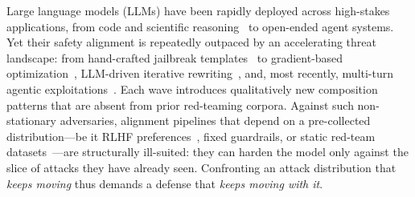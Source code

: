 Large language models (LLMs) have been rapidly deployed across high-stakes applications, from code and scientific reasoning~\citep{bai2025intern} to open-ended agent systems. Yet their safety alignment is repeatedly outpaced by an accelerating threat landscape: from hand-crafted jailbreak templates~\citep{shen2023doanythingnow} to gradient-based optimization~\citep{zou2023universal}, LLM-driven iterative rewriting~\citep{chao2023pair, mehrotra2024tap, liu2023autodan}, and, most recently, multi-turn agentic exploitations~\citep{rahman2025xteaming, qi2025majic, samvelyan2024rainbow}. Each wave introduces qualitatively new composition patterns that are absent from prior red-teaming corpora. Against such non-stationary adversaries, alignment pipelines that depend on a pre-collected distribution---be it RLHF preferences~\citep{ouyang2022training, bai2022constitutional, dai2023safe}, fixed guardrails, or static red-team datasets~\citep{jiang2024wildteaming, xie2024sorry}---are structurally ill-suited: they can harden the model only against the slice of attacks they have already seen. Confronting an attack distribution that \emph{keeps moving} thus demands a defense that \emph{keeps moving with it}.

